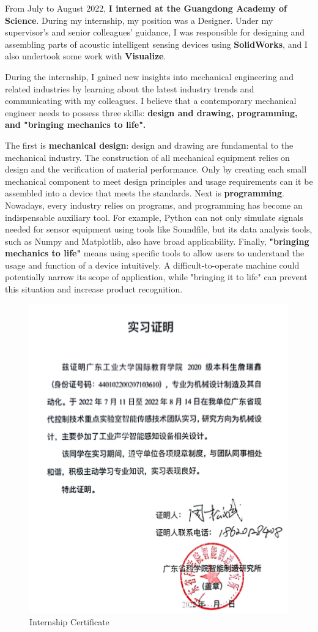 From July to August 2022, \textbf{I interned at the Guangdong Academy of Science}. During my internship, my position was a Designer. Under my supervisor's and senior colleagues' guidance, I was responsible for designing and assembling parts of acoustic intelligent sensing devices using \textbf{SolidWorks}, and I also undertook some work with\textbf{ Visualize}.

During the internship, I gained new insights into mechanical engineering and related industries by learning about the latest industry trends and communicating with my colleagues. I believe that a contemporary mechanical engineer needs to possess three skills: \textbf{design and drawing, programming, and "bringing mechanics to life".}

The first is \textbf{mechanical design}: design and drawing are fundamental to the mechanical industry. The construction of all mechanical equipment relies on design and the verification of material performance. Only by creating each small mechanical component to meet design principles and usage requirements can it be assembled into a device that meets the standards. Next is \textbf{programming}. Nowadays, every industry relies on programs, and programming has become an indispensable auxiliary tool. For example, Python can not only simulate signals needed for sensor equipment using tools like Soundfile, but its data analysis tools, such as Numpy and Matplotlib, also have broad applicability. Finally, \textbf{"bringing mechanics to life"} means using specific tools to allow users to understand the usage and function of a device intuitively. A difficult-to-operate machine could potentially narrow its scope of application, while "bringing it to life" can prevent this situation and increase product recognition.

\begin{figure}
	\centering
	\includegraphics[width=0.5\linewidth]{Introduction/figures/实习}
	\caption{Internship Certificate}
	\label{fig:}
\end{figure}

